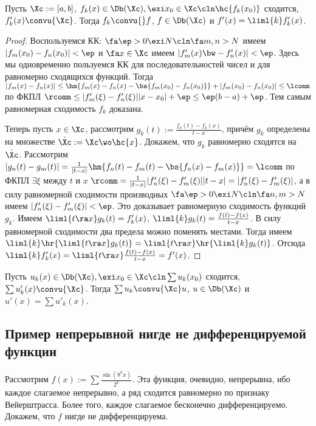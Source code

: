 \documentclass[a4paper]{article}
\begin{document}
\begin{theorem}[О дифференцировании]
Пусть $\Xc := [a,b]$, $f_k(x) \in\Db(\Xc), \exi x_0 \in \Xc\cln \hc{f_k(x_0)}$ сходится, $f'_k(x)\convu{\Xc}$. Тогда
$f_k\convu{}f$, $f \in\Db(\Xc)$ и $f'(x)=\liml{k}f'_k(x)$.
\end{theorem}
\begin{proof}
Воспользуемся КК: $\fa \ep > 0 \exi N\cln \fa m,n>N$ имеем $|f_m(x_0)-f_n(x_0)|<\ep$ и $\fa x \in \Xc$ имеем
$|f'_m(x)\bw-f'_n(x)| < \ep$. Здесь мы одновременно пользуемся КК для последовательностей чисел и
для равномерно сходящихся функций. Тогда $|f_m(x)-f_n(x)| \le \hm{f_m(x)-f_n(x)-\bs{f_m(x_0)-f_n(x_0)} } + |f_m(x_0)-f_n(x_0)| \le \lcomm$ по ФКПЛ $\rcomm \le |f'_m(\xi)-f'_n(\xi)||x-x_0|+\ep
\le \ep(b-a)+\ep$. Тем самым равномерная сходимость $f_k$ доказана.

Теперь пусть $x \in \Xc$, рассмотрим $g_k(t) := \frac{f_k(t)-f_k(x)}{t-x}$, причём $g_k$ определены на множестве $\dot{\Xc} := \Xc \wo \hc{x}$.
Докажем, что $g_k$ равномерно сходятся на $\dot{\Xc}$. Рассмотрим $|g_n(t)-g_m(t)|=\frac{1}{|t-x|}\hm{f_n(t)-f_m(t)-\bs{f_n(x)-f_m(x)}} =
\lcomm$ по ФКПЛ $\exi \xi$ между $t$ и $x$ $\rcomm=\frac{1}{|t-x|}|f'_n(\xi)-f'_m(\xi)||t-x|=|f'_n(\xi)-f'_m(\xi)|$, а в силу равномерной сходимости
производных $\fa \ep>0 \exi N\cln \fa n,m>N$ имеем $|f'_n(\xi)-f'_m(\xi)|< \ep$. Это доказывает равномерную сходимость функций $g_k$.
Имеем $\liml{t\ra x} g_k(t)=f'_k(x)$, $\liml{k} g_k(t)=\frac{f(t)-f(x)}{t-x}$. В силу равномерной сходимости два предела
можно поменять местами. Тогда имеем $\liml{k}\hr{\liml{t\ra x} g_k(t)} =\liml{t\ra x}\hr{ \liml{k}g_k(t)} $. Отсюда
$\liml{k}f'_k(x)=\liml{t\ra x} \frac{f(t)-f(x)}{t-x}=f'(x)$.
\end{proof}

\begin{imp}
Пусть $u_k(x) \in\Db(\Xc), \exi x_0 \in \Xc\cln \sum u_k(x_0)$ сходится, $\sum u'_k(x)\convu{\Xc}$. Тогда
$\sum u_k\convu{\Xc}u$, $u \in\Db(\Xc)$ и $u'(x)=\sum u'_k(x)$.
\end{imp}

\subsection{Пример непрерывной нигде не дифференцируемой функции}
Рассмотрим $f(x) := \sum \frac{\sin(8^kx)}{2^k}$. Эта функция, очевидно, непрерывна, ибо каждое слагаемое непрерывно,
а ряд сходится равномерно по признаку Вейерштрасса. Более того, каждое слагаемое бесконечно дифференцируемо. Докажем, что $f$ нигде
не дифференцируема.
\end{document}
